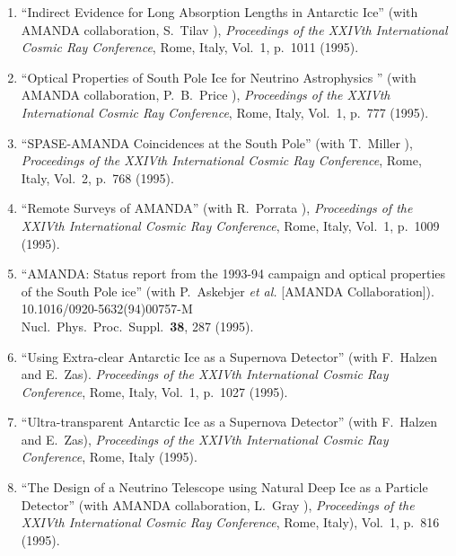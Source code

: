 \begin{enumerate}
\item ``Indirect Evidence for Long Absorption Lengths in
        Antarctic Ice''    (with AMANDA collaboration,
        S.~Tilav \etal), {\it Proceedings of the   XXIVth
        International Cosmic Ray Conference}, Rome, Italy,
        Vol.~1, p.~1011   (1995).

\item ``Optical Properties of South Pole Ice for Neutrino
        Astrophysics  '' (with AMANDA collaboration,
        P.~B.~Price \etal), {\it Proceedings of   the XXIVth
        International Cosmic Ray Conference}, Rome, Italy,
        Vol.~1, p.~777 (1995).

\item ``SPASE-AMANDA Coincidences at the South Pole'' (with
        T.~Miller   \etal), {\it Proceedings of the XXIVth
        International Cosmic Ray     Conference}, Rome,
        Italy, Vol.~2, p.~768 (1995).

\item ``Remote Surveys of AMANDA'' (with R.~Porrata \etal),
        {\it   Proceedings of the XXIVth International
        Cosmic Ray Conference},   Rome, Italy, Vol.~1,
        p.~1009 (1995).

\item ``AMANDA: Status report from the 1993-94 campaign and
        optical properties of the South Pole ice'' (with
        P.~Askebjer {\it et al.}  [AMANDA Collaboration]).
        10.1016/0920-5632(94)00757-M \\{}Nucl.\ Phys.\
        Proc.\ Suppl.\  {\bf 38}, 287 (1995).

\item ``Using Extra-clear Antarctic Ice as a Supernova
        Detector'' (with   F.~Halzen and E.~Zas).  {\it
        Proceedings of the XXIVth International     Cosmic
        Ray Conference}, Rome, Italy, Vol.~1, p.~1027
        (1995).

\item ``Ultra-transparent Antarctic Ice as a Supernova
        Detector'' (with   F.~Halzen and E.~Zas), {\it
        Proceedings of the XXIVth International     Cosmic
        Ray Conference}, Rome, Italy (1995).

\item ``The Design of a Neutrino Telescope using Natural
        Deep Ice as a   Particle Detector'' (with AMANDA
        collaboration, L.~Gray \etal), {\it     Proceedings
        of the XXIVth International Cosmic Ray Conference},
        Rome, Italy), Vol.~1, p.~816 (1995).


\end{enumerate}
